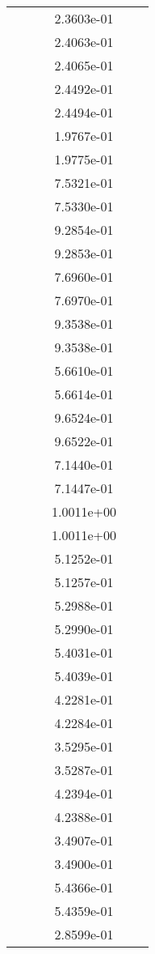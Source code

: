 \begin{xltabular}{\textwidth}{r|rS[table-format=1.3e+2]S[table-format=1.4e+2]S[table-format=1.4e+2]S[table-format=-1.5]}
&  &  & 2.3603e-01 & & \\
&  &  & 2.4063e-01 & & \\
&  &  & 2.4065e-01 & & \\
&  &  & 2.4492e-01 & & \\
&  &  & 2.4494e-01 & & \\
&  &  & 1.9767e-01 & & \\
&  &  & 1.9775e-01 & & \\
&  &  & 7.5321e-01 & & \\
&  &  & 7.5330e-01 & & \\
&  &  & 9.2854e-01 & & \\
&  &  & 9.2853e-01 & & \\
&  &  & 7.6960e-01 & & \\
&  &  & 7.6970e-01 & & \\
&  &  & 9.3538e-01 & & \\
&  &  & 9.3538e-01 & & \\
&  &  & 5.6610e-01 & & \\
&  &  & 5.6614e-01 & & \\
&  &  & 9.6524e-01 & & \\
&  &  & 9.6522e-01 & & \\
&  &  & 7.1440e-01 & & \\
&  &  & 7.1447e-01 & & \\
&  &  & 1.0011e+00 & & \\
&  &  & 1.0011e+00 & & \\
&  &  & 5.1252e-01 & & \\
&  &  & 5.1257e-01 & & \\
&  &  & 5.2988e-01 & & \\
&  &  & 5.2990e-01 & & \\
&  &  & 5.4031e-01 & & \\
&  &  & 5.4039e-01 & & \\
&  &  & 4.2281e-01 & & \\
&  &  & 4.2284e-01 & & \\
&  &  & 3.5295e-01 & & \\
&  &  & 3.5287e-01 & & \\
&  &  & 4.2394e-01 & & \\
&  &  & 4.2388e-01 & & \\
&  &  & 3.4907e-01 & & \\
&  &  & 3.4900e-01 & & \\
&  &  & 5.4366e-01 & & \\
&  &  & 5.4359e-01 & & \\
&  &  & 2.8599e-01 & & \\

\end{xltabular}
